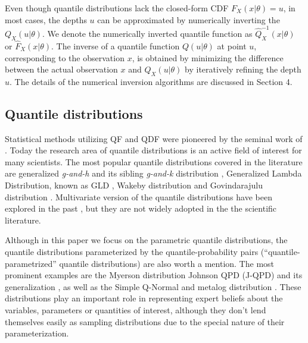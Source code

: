 \documentclass[
  12pt,
]{article}
\begin{document}
Even though quantile distributions lack the closed-form CDF \(F_X(x|\theta)=u\), in most cases, the depths \(u\) can be approximated by numerically inverting the \(Q_X(u|\theta)\). We denote the numerically inverted quantile function as \(\widehat{Q}^{-1}_X(x|\theta)\) or \(\widehat{F}_X(x|\theta)\). The inverse of a quantile function \(Q(u|\theta)\) at point \(u\), corresponding to the observation \(x\), is obtained by minimizing the difference between the actual observation \(x\) and \(Q_X(u|\theta)\) by iteratively refining the depth \(u\). The details of the numerical inversion algorithms are discussed in Section 4.

\hypertarget{quantile-distributions}{%
\subsection{Quantile distributions}\label{quantile-distributions}}

Statistical methods utilizing QF and QDF were pioneered by the seminal work of \citet{parzen1979NonparametricStatisticalData}. Today the research area of quantile distributions is an active field of interest for many scientists. The most popular quantile distributions covered in the literature are generalized \emph{g-and-h} and its sibling \emph{g-and-k} distribution \citep{haynes2005BayesianEstimationGandk, jacob2017LikelihoodCalculationGandk, prangle2017GkPackageGandk, rayner2002NumericalMaximumLikelihood}, Generalized Lambda Distribution, known as GLD \citep{aldeni2017FamiliesDistributionsArising, chalabi2012FlexibleDistributionModeling, dedduwakumara2021EfficientEstimatorParameters, fournier2007EstimatingParametersGeneralized, freimer1988StudyGeneralizedTukey}, Wakeby distribution \citep{rahman2015ApplicabilityWakebyDistribution} and Govindarajulu distribution \citep{nair2012GovindarajuluDistributionProperties, nair2013QuantileBasedReliabilityAnalysis}. Multivariate version of the quantile distributions have been explored in the past \citep{field2006MultivariateGandhDistribution, serfling2002QuantileFunctionsMultivariate}, but they are not widely adopted in the the scientific literature.

Although in this paper we focus on the parametric quantile distributions, the quantile distributions parameterized by the quantile-probability pairs (``quantile-parametrized'' quantile distributions) are also worth a mention. The most prominent examples are the Myerson distribution \citep{myerson2005ProbabilityModelsEconomic} Johnson QPD (J-QPD) and its generalization \citep{hadlock2017JohnsonQuantileParameterizedDistributions, hadlock2019GeneralizedJohnsonQuantileParameterized}, as well as the Simple Q-Normal\citep{keelin2011QuantileParameterizedDistributions} and metalog distribution \citep{keelin2016MetalogDistributions}. These distributions play an important role in representing expert beliefs about the variables, parameters or quantities of interest, although they don't lend themselves easily as sampling distributions due to the special nature of their parameterization.
\end{document}
